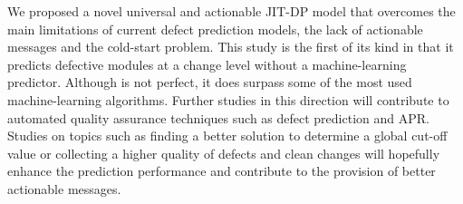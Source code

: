 We proposed a novel universal and actionable JIT-DP model that overcomes the main limitations of current defect prediction models, the lack of actionable messages and the cold-start problem.
This study is the first of its kind in that it predicts defective modules at a change level without a machine-learning predictor. 
Although {\simfinmo} is not perfect, it does surpass some of the most used machine-learning algorithms.
Further studies in this direction will contribute to automated quality assurance techniques such as defect prediction and APR.
Studies on topics such as finding a better solution to determine a global cut-off value or collecting a higher quality of defects and clean changes will hopefully enhance the prediction performance and contribute to the provision of better actionable messages.